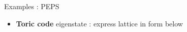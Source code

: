 \documentclass{beamer}
\begin{document}
\begin{frame}{Examples : PEPS}
	\begin{itemize}
	\item \textbf{Toric code} eigenstate : express lattice in form below
	\end{itemize}
	
\end{frame}
\end{document}
